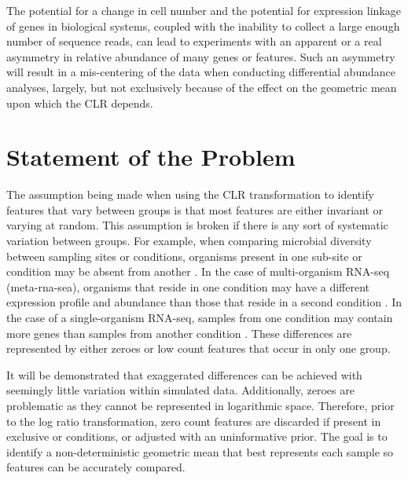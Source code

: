 \documentclass [10pt]{article}
\begin{document}
The potential for a change in cell number and the potential for expression linkage of genes in biological systems, coupled with the inability to collect a large enough number of sequence reads, can lead to experiments with an apparent or a real asymmetry in relative abundance of many genes or features. Such an asymmetry will result in a mis-centering of the data when conducting differential abundance analyses, largely, but not exclusively because of the effect on the geometric mean upon which the CLR depends. 

\section{Statement of the Problem}
\vskip-0.25cm

The assumption being made when using the CLR transformation to identify features that vary between groups is that most features are either invariant or varying at random. This assumption is broken if there is any sort of systematic variation between groups. For example, when comparing microbial diversity between sampling sites or conditions, organisms present in one sub-site or condition may be absent from another \cite{Macklaim:2015aa,Hummelen:2010,Gajer:2012}. In the case of multi-organism RNA-seq (meta-rna-sea), organisms that reside in one condition may have a different expression profile and abundance than those that reside in a second condition \cite{macklaim:2013}. In the case of a single-organism RNA-seq, samples from one condition may contain more genes than samples from another condition \cite{Lang:2015aa,Peng:2014aa,Zhao:2013aa}. These differences are represented by either zeroes or low count features that occur in only one group. 

It will be demonstrated that exaggerated differences can be achieved with seemingly little variation within simulated data. Additionally, zeroes are problematic as they cannot be represented in logarithmic space. Therefore, prior to the log ratio transformation, zero count features are discarded if present in exclusive or conditions, or adjusted with an uninformative prior. The goal is to identify a non-deterministic geometric mean that best represents each sample so features can be accurately compared.
\end{document}
